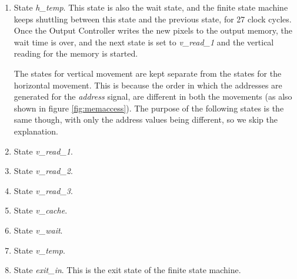 \documentclass[11pt,a4paper]{article}
\begin{document}
\begin{enumerate}
\item State \textit{h\_temp}. This state is also the wait state, and the finite state machine keeps shuttling between this state and the previous state, for 27 clock cycles. Once the Output Controller writes the new pixels to the output memory, the wait time is over, and the next state is set to \textit{v\_read\_1} and the vertical reading for the memory is started.

The states for vertical movement are kept separate from the states for the horizontal movement. This is because the order in which the addresses are generated for the \textit{address} signal, are different in both the movements (as also shown in figure \ref{fig:memaccess}). The purpose of the following states is the same though, with only the address values being different, so we skip the explanation.
\item State \textit{v\_read\_1}. 

\item State \textit{v\_read\_2}. 

\item State \textit{v\_read\_3}. 

\item State \textit{v\_cache}. 

\item State \textit{v\_wait}. 

\item State \textit{v\_temp}.

\item State \textit{exit\_in}. This is the exit state of the finite state machine.

\end{enumerate}
\end{document}
